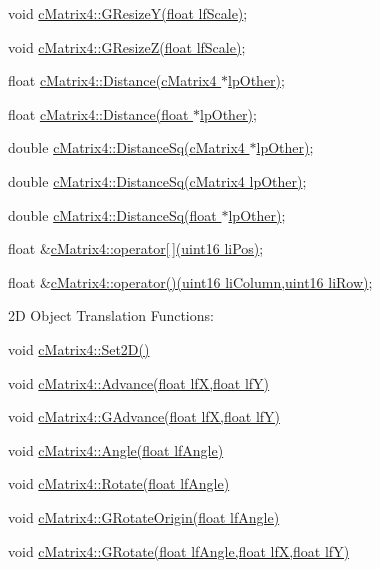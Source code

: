  void \hyperlink{classc_matrix4_a13fda6e0dc1b19f7f136c1963bbdac77}{cMatrix4::GResizeY(float lfScale)}; \par
 void \hyperlink{classc_matrix4_a74217e4c12e8f5623a572535ba443bc4}{cMatrix4::GResizeZ(float lfScale)}; \par
 \par
 float \hyperlink{classc_matrix4_acd04bb06d1d12807b203b0aaf9e9b608}{cMatrix4::Distance(cMatrix4 $\ast$lpOther)}; \par
 float \hyperlink{classc_matrix4_a83fd4655f67a81cb42f3c50262ec593e}{cMatrix4::Distance(float $\ast$lpOther)}; \par
 double \hyperlink{classc_matrix4_afb4a1edc36d2de9330e48bd182fe2a9b}{cMatrix4::DistanceSq(cMatrix4 $\ast$lpOther)}; \par
 double \hyperlink{classc_matrix4_ad225d8db157a99b593f774e08c266722}{cMatrix4::DistanceSq(cMatrix4 lpOther)}; \par
 double \hyperlink{classc_matrix4_ac524fac9525c6ff780e95c648b229e41}{cMatrix4::DistanceSq(float $\ast$lpOther)}; \par
 \par
 float \&\hyperlink{classc_matrix4_a4b91a4d790f5a0decc76d41e54b80049}{cMatrix4::operator\mbox{[}$\,$\mbox{]}(uint16 liPos)}; \par
 float \&\hyperlink{classc_matrix4_a1e17bf69091f804aec716524dbdec375}{cMatrix4::operator()(uint16 liColumn,uint16 liRow)}; \par
 2D Object Translation Functions: \par
 void \hyperlink{classc_matrix4_ad24236403317622459c3309938be9d21}{cMatrix4::Set2D()} \par
 \par
 void \hyperlink{classc_matrix4_ab956ec27a465b889126632475fd7d703}{cMatrix4::Advance(float lfX,float lfY)} \par
 void \hyperlink{classc_matrix4_a2dc12cbe708c7bc63ca2beff47c0c835}{cMatrix4::GAdvance(float lfX,float lfY)} \par
 \par
 void \hyperlink{classc_matrix4_ac86eb165802e359a11ace5db20b73c72}{cMatrix4::Angle(float lfAngle)} \par
 void \hyperlink{classc_matrix4_ab21d0553250b8ca4b0388105afc79478}{cMatrix4::Rotate(float lfAngle)} \par
 void \hyperlink{classc_matrix4_a04a196147274eb6b3d1aca1782c26091}{cMatrix4::GRotateOrigin(float lfAngle)} \par
 void \hyperlink{classc_matrix4_a5115db44a0c51d97be3d5791fb19d18a}{cMatrix4::GRotate(float lfAngle,float lfX,float lfY)} \par
